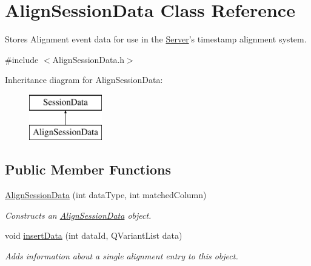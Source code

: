 \hypertarget{class_align_session_data}{\section{Align\-Session\-Data Class Reference}
\label{class_align_session_data}
}


Stores Alignment event data for use in the \hyperlink{class_server}{Server}'s timestamp alignment system.  




{\ttfamily \#include $<$Align\-Session\-Data.\-h$>$}

Inheritance diagram for Align\-Session\-Data\-:\begin{figure}[H]
\begin{center}
\leavevmode
\includegraphics[height=2.000000cm]{class_align_session_data}
\end{center}
\end{figure}
\subsection*{Public Member Functions}
\begin{DoxyCompactItemize}
\item 
\hyperlink{class_align_session_data_ac77eec1a0456a1c24b21d10a6db0d905}{Align\-Session\-Data} (int data\-Type, int matched\-Column)
\begin{DoxyCompactList}\small\item\em Constructs an \hyperlink{class_align_session_data}{Align\-Session\-Data} object. \end{DoxyCompactList}\item 
void \hyperlink{class_align_session_data_a5b407864f3c2439050f5541407bfd645}{insert\-Data} (int data\-Id, Q\-Variant\-List data)
\begin{DoxyCompactList}\small\item\em Adds information about a single alignment entry to this object. \end{DoxyCompactList}\end{DoxyCompactItemize}
